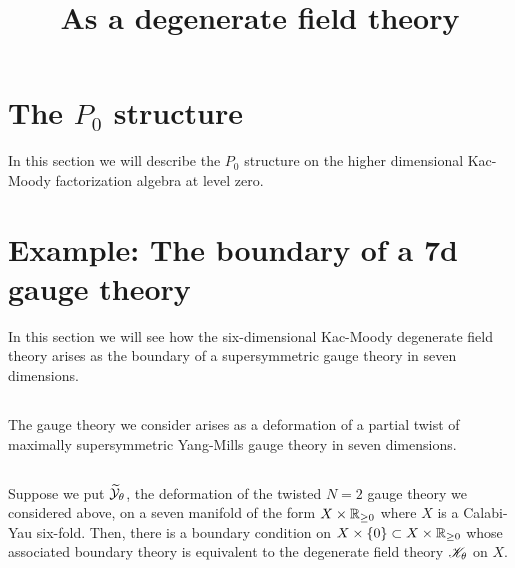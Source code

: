 \documentclass[10pt]{amsart}
\title{As a degenerate field theory}
\begin{document}
\maketitle

\section{The $P_0$ structure}

In this section we will describe the $P_0$ structure on the higher dimensional Kac-Moody factorization algebra at level zero. 

\section{Example: The boundary of a 7d gauge theory}

In this section we will see how the six-dimensional Kac-Moody degenerate field theory arises as the boundary of a supersymmetric gauge theory in seven dimensions.

\subsection{}

The gauge theory we consider arises as a deformation of a partial twist of maximally supersymmetric Yang-Mills gauge theory in seven dimensions. 

\subsection{}

\begin{thm} Suppose we put $\widetilde{\mathcal Y}_\theta$, the deformation of the twisted $N=2$ gauge theory we considered above, on a seven manifold of the form $X \times \mathbb R_{\geq 0}$ where $X$ is a Calabi-Yau six-fold. Then, there is a boundary condition on $X \times \{0\} \subset X \times \mathbb R_{\geq 0}$ whose associated boundary theory is equivalent to the degenerate field theory $\mathscr K_\theta$ on $X$. 
\end{thm}
\end{document}
